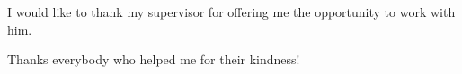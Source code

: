 I would like to thank my supervisor for offering me the opportunity to work with him. 

Thanks everybody who helped me for their kindness!